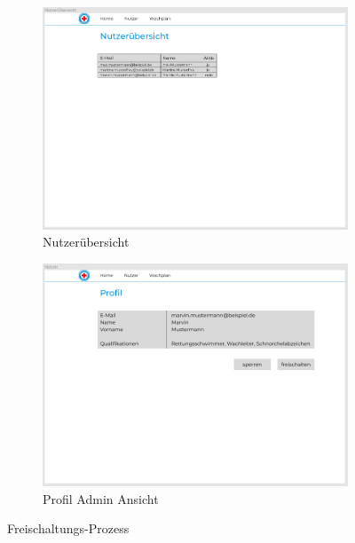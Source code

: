 \documentclass[fontsize=12pt,openright,oneside,paper=a4,BCOR=1cm]{scrbook}
\begin{document}
\begin{figure}[H]
  \centering
  \begin{subfigure}[b]{0.7\linewidth}
    \includegraphics[width=\linewidth]{Anlagen/Figma/6-Nutzeruebersicht.png}
    \caption{Nutzerübersicht}
  \end{subfigure}
  \begin{subfigure}[b]{0.7\linewidth}
    \includegraphics[width=\linewidth]{Anlagen/Figma/7-ProfilAdminSicht.png}
    \caption{Profil Admin Ansicht}
  \end{subfigure}
  \caption{Freischaltungs-Prozess}
  \label{fig:freischaltprozess}
\end{figure}

\end{document}

